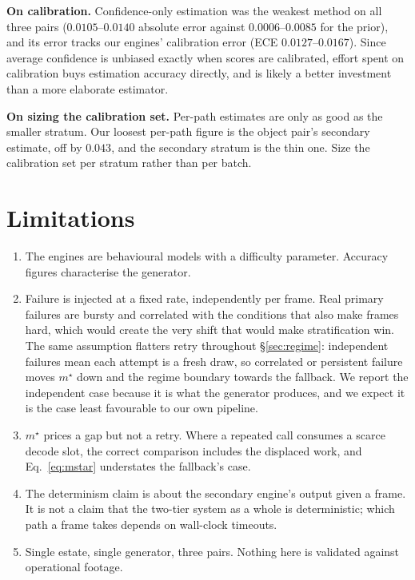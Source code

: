\documentclass[11pt,a4paper]{article}
\begin{document}
\textbf{On calibration.} Confidence-only estimation was the weakest method on all
three pairs ($0.0105$--$0.0140$ absolute error against $0.0006$--$0.0085$ for the
prior), and its error tracks our engines' calibration error
(ECE $0.0127$--$0.0167$). Since average confidence is unbiased exactly when scores
are calibrated, effort spent on calibration buys estimation accuracy directly, and
is likely a better investment than a more elaborate estimator.

\textbf{On sizing the calibration set.} Per-path estimates are only as good as the
smaller stratum. Our loosest per-path figure is the object pair's secondary
estimate, off by $0.043$, and the secondary stratum is the thin one. Size the
calibration set per stratum rather than per batch.

\section{Limitations}

\begin{enumerate}
\item The engines are behavioural models with a difficulty parameter. Accuracy
figures characterise the generator.
\item Failure is injected at a fixed rate, independently per frame. Real primary
failures are bursty and correlated with the conditions that also make frames
hard, which would create the very shift that would make stratification win. The
same assumption flatters retry throughout \S\ref{sec:regime}: independent failures
mean each attempt is a fresh draw, so correlated or persistent failure moves
$m^\star$ down and the regime boundary towards the fallback. We report the
independent case because it is what the generator produces, and we expect it is
the case least favourable to our own pipeline.
\item $m^\star$ prices a gap but not a retry. Where a repeated call consumes a
scarce decode slot, the correct comparison includes the displaced work, and
Eq.~\ref{eq:mstar} understates the fallback's case.
\item The determinism claim is about the secondary engine's output given a frame.
It is not a claim that the two-tier system as a whole is deterministic; which path
a frame takes depends on wall-clock timeouts.
\item Single estate, single generator, three pairs. Nothing here is validated
against operational footage.
\end{enumerate}
\end{document}

